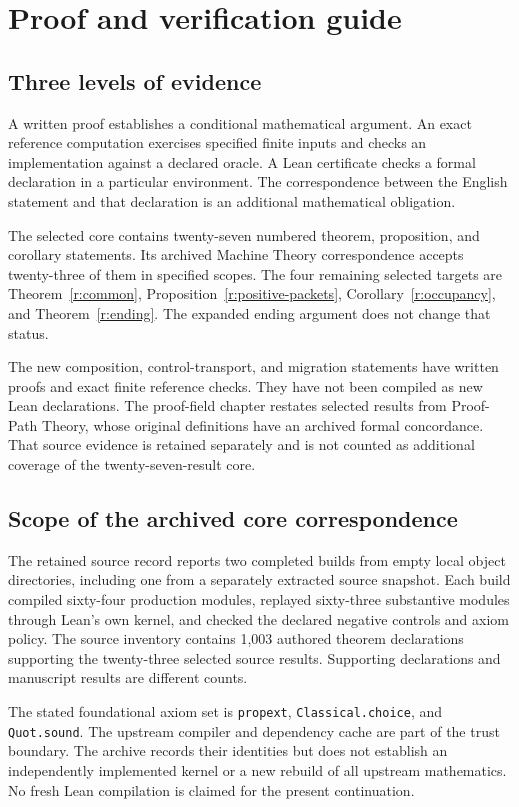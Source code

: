 \chapter{Proof and verification guide}\label{app:verification}

\section*{Three levels of evidence}
A written proof establishes a conditional mathematical argument. An exact reference computation exercises specified finite inputs and checks an implementation against a declared oracle. A Lean certificate checks a formal declaration in a particular environment. The correspondence between the English statement and that declaration is an additional mathematical obligation.

The selected core contains twenty-seven numbered theorem, proposition, and corollary statements. Its archived Machine Theory correspondence accepts twenty-three of them in specified scopes. The four remaining selected targets are Theorem~\ref{r:common}, Proposition~\ref{r:positive-packets}, Corollary~\ref{r:occupancy}, and Theorem~\ref{r:ending}. The expanded ending argument does not change that status.

The new composition, control-transport, and migration statements have written proofs and exact finite reference checks. They have not been compiled as new Lean declarations. The proof-field chapter restates selected results from Proof-Path Theory, whose original definitions have an archived formal concordance. That source evidence is retained separately and is not counted as additional coverage of the twenty-seven-result core.

\section*{Scope of the archived core correspondence}
The retained source record reports two completed builds from empty local object directories, including one from a separately extracted source snapshot. Each build compiled sixty-four production modules, replayed sixty-three substantive modules through Lean's own kernel, and checked the declared negative controls and axiom policy. The source inventory contains 1,003 authored theorem declarations supporting the twenty-three selected source results. Supporting declarations and manuscript results are different counts.

The stated foundational axiom set is \texttt{propext}, \texttt{Classical.choice}, and \texttt{Quot.sound}. The upstream compiler and dependency cache are part of the trust boundary. The archive records their identities but does not establish an independently implemented kernel or a new rebuild of all upstream mathematics. No fresh Lean compilation is claimed for the present continuation.

